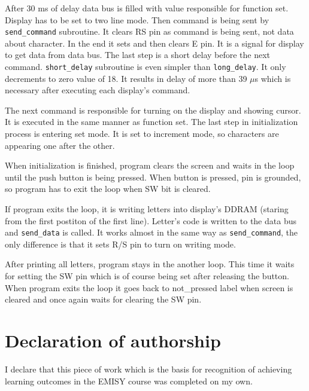 \documentclass{article}
\begin{document}
After 30 ms of delay data bus is filled with value responsible for function set. 
Display has to be set to two line mode. Then command is being sent by \texttt{send\_command}
subroutine. It clears RS pin as command is being sent, not data about character. In the end
it sets and then clears E pin. It is a signal for display to get data from data bus. The last
step is a short delay before the next command. \texttt{short\_delay} subroutine
is even simpler than \texttt{long\_delay}. It only decrements to zero value of 18.
It results in delay of more than 39 $\mu$s which is necessary after executing each display's command.

The next command is responsible for turning on the display and showing cursor. It is executed
in the same manner as function set. The last step in initialization process is entering
set mode. It is set to increment mode, so characters are appearing one after the other.

When initialization is finished, program clears the screen and waits in the loop until
the push button is being pressed. When button is pressed, pin is grounded, so program has to
exit the loop when SW bit is cleared.

If program exits the loop, it is writing letters into display's DDRAM (staring from the first postiton of the first line).
Letter's code is written to the data bus and \texttt{send\_data} is called.
It works almost in the same way as \texttt{send\_command}, the only difference is that
it sets R/S pin to turn on writing mode.

After printing all letters, program stays in the another loop. This time it waits for setting
the SW pin which is of course being set after releasing the button. When program exits the loop
it goes back to not\_pressed label when screen is cleared and once again waits for clearing the SW pin.

\section*{Declaration of authorship}
I declare that this piece of work which is the basis for recognition of achieving learning outcomes in the EMISY course was completed on my own.
\end{document}
